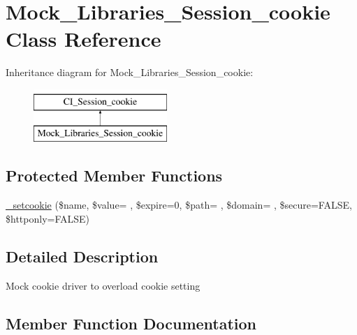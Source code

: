 \hypertarget{class_mock___libraries___session__cookie}{}\section{Mock\+\_\+\+Libraries\+\_\+\+Session\+\_\+cookie Class Reference}
\label{class_mock___libraries___session__cookie}
Inheritance diagram for Mock\+\_\+\+Libraries\+\_\+\+Session\+\_\+cookie\+:\begin{figure}[H]
\begin{center}
\leavevmode
\includegraphics[height=2.000000cm]{class_mock___libraries___session__cookie}
\end{center}
\end{figure}
\subsection*{Protected Member Functions}
\begin{DoxyCompactItemize}
\item 
\hyperlink{class_mock___libraries___session__cookie_a669c81300b6abc957d56d1ae59cc264c}{\+\_\+setcookie} (\$name, \$value= \textquotesingle{}\textquotesingle{}, \$expire=0, \$path= \textquotesingle{}\textquotesingle{}, \$domain= \textquotesingle{}\textquotesingle{}, \$secure=F\+A\+L\+S\+E, \$httponly=F\+A\+L\+S\+E)
\end{DoxyCompactItemize}


\subsection{Detailed Description}
Mock cookie driver to overload cookie setting 

\subsection{Member Function Documentation}
\hypertarget{class_mock___libraries___session__cookie_a669c81300b6abc957d56d1ae59cc264c}{}
